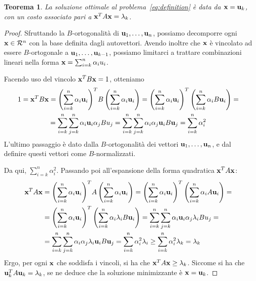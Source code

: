 \documentclass[10pt,a4paper]{article}
\newtheorem{theorem}{Teorema}[section]
\newtheorem{proof}{Dimostrazione}[section]
\begin{document}
\begin{theorem}\label{thr:soluzione_ottimizzazione}
    La soluzione ottimale al problema~\eqref{eq:definition} è data da \(\vb{x}=\vb{u}_k\), con un costo associato pari a \(\vb{x}^T A \vb{x} = \lambda_k\).
\end{theorem}
\begin{proof}
    Sfruttando la \(B\)-ortogonalità di \(\vb{u}_1,\ldots,\vb{u}_n\), possiamo decomporre ogni \(\vb{x} \in \mathcal{R}^n\) con la base definita dagli autovettori. Avendo inoltre che \(\vb{x}\) è vincolato ad essere \(B\)-ortogonale a \(\vb{u}_1,\ldots,\vb{u}_{k-1}\), possiamo limitarci a trattare combinazioni lineari nella forma \(\vb{x} = \sum_{i=k}^n \alpha_i u_i\).

    Facendo uso del vincolo \(\vb{x}^T B\vb{x} = 1\), otteniamo
    \begin{multline}
        1 = \vb{x}^T B\vb{x} = {\left(\sum_{i=k}^n \alpha_i \vb{u}_i\right)}^T B \left(\sum_{i=k}^n \alpha_i \vb{u}_i\right) = {\left(\sum_{i=k}^n \alpha_i \vb{u}_i\right)}^T \left(\sum_{i=k}^n \alpha_i B \vb{u}_i\right) = \\
        = \sum_{i=k}^n\sum_{j=k}^n \alpha_i \vb{u}_i \alpha_j B u_j = \sum_{i=k}^n\sum_{j=k}^n \alpha_i \alpha_j \vb{u}_i B \vb{u}_j = \sum_{i=k}^n \alpha_i^2
    \end{multline}
    L'ultimo passaggio è dato dalla \(B\)-ortogonalità dei vettori \(\vb{u}_1,\ldots,\vb{u}_n\), e dal definire questi vettori come \(B\)-normalizzati.

    Da qui, \(\sum_{i=k}^n \alpha_i^2\).
    Passando poi all'espansione della forma quadratica \(\vb{x}^T A \vb{x}\):
    \begin{align}
        \vb{x}^T A \vb{x} &= {\left(\sum_{i=k}^n \alpha_i \vb{u}_i\right)}^T A \left(\sum_{i=k}^n \alpha_i \vb{u}_i\right) = {\left(\sum_{i=k}^n \alpha_i \vb{u}_i\right)}^T \left(\sum_{i=k}^n \alpha_i A \vb{u}_i\right) = \\
        &= {\left(\sum_{i=k}^n \alpha_i \vb{u}_i\right)}^T \left(\sum_{i=k}^n \alpha_i \lambda_i B \vb{u}_i\right) = \sum_{i=k}^n\sum_{j=k}^n \alpha_i \vb{u}_i \alpha_j \lambda_i B u_j = \\
        &= \sum_{i=k}^n\sum_{j=k}^n \alpha_i\alpha_j \lambda_i\vb{u}_i B \vb{u}_j = \sum_{i=k}^n \alpha_i^2 \lambda_i \geq \sum_{i=k}^n \alpha_i^2 \lambda_k = \lambda_k
    \end{align}
    Ergo, per ogni \(\vb{x}\) che soddisfa i vincoli, si ha che \(\vb{x}^T A \vb{x} \geq \lambda_k\). Siccome si ha che \(\vb{u}_k^T A \vb{u}_k = \lambda_k\), se ne deduce che la soluzione minimizzante è \(\vb{x} = \vb{u}_k\).
\end{proof}

\printbibliography
\end{document}
